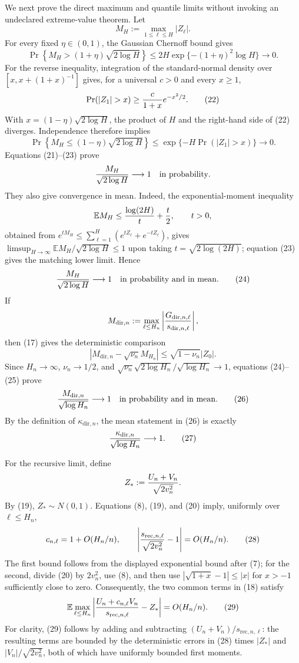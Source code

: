 We next prove the direct maximum and quantile limits without invoking an undeclared extreme-value theorem.  Let
\[
 M_H:=\max_{1\leq\ell\leq H}|Z_\ell|.
\]
For every fixed \(\eta\in(0,1)\), the Gaussian Chernoff bound gives
\[
 \Pr\!\left\{M_H>(1+\eta)\sqrt{2\log H}\right\}
 \leq2H\exp\{- (1+\eta)^2\log H\}\longrightarrow0.
 \tag{21}
\]
For the reverse inequality, integration of the standard-normal density over
\([x,x+(1+x)^{-1}]\) gives, for a universal \(c>0\) and every \(x\geq1\),
\[
 \Pr(|Z_1|>x)\geq {c\over1+x}e^{-x^2/2}.
 \tag{22}
\]
With \(x=(1-\eta)\sqrt{2\log H}\), the product of \(H\) and the right-hand side of (22) diverges.  Independence therefore implies
\[
 \Pr\!\left\{M_H\leq(1-\eta)\sqrt{2\log H}\right\}
 \leq\exp\{-H\Pr(|Z_1|>x)\}\longrightarrow0.
 \tag{23}
\]
Equations (21)--(23) prove
\[
 {M_H\over\sqrt{2\log H}}\longrightarrow1
 \quad\hbox{in probability}.
\]
They also give convergence in mean.  Indeed, the exponential-moment inequality
\[
 \mathbb E M_H\leq {\log(2H)\over t}+{t\over2},
 \qquad t>0,
\]
obtained from \(e^{tM_H}\leq\sum_{\ell=1}^H(e^{tZ_\ell}+e^{-tZ_\ell})\), gives
\(\limsup_{H\to\infty}\mathbb E M_H/\sqrt{2\log H}\leq1\) upon taking \(t=\sqrt{2\log(2H)}\); equation (23) gives the matching lower limit.  Hence
\[
 {M_H\over\sqrt{2\log H}}\longrightarrow1
 \quad\hbox{in probability and in mean}.
 \tag{24}
\]
If
\[
 M_{\mathrm{dir},n}:=\max_{\ell\leq H_n}
 \left|{G_{\mathrm{dir},n,\ell}\over s_{\mathrm{dir},n,\ell}}\right|,
\]
then (17) gives the deterministic comparison
\[
 \left|M_{\mathrm{dir},n}-\sqrt{\nu_n}M_{H_n}\right|
 \leq\sqrt{1-\nu_n}|Z_0|.
 \tag{25}
\]
Since \(H_n\to\infty\), \(\nu_n\to1/2\), and
\(\sqrt{\nu_n}\sqrt{2\log H_n}/\sqrt{\log H_n}\to1\), equations (24)--(25) prove
\[
 {M_{\mathrm{dir},n}\over\sqrt{\log H_n}}\longrightarrow1
 \quad\hbox{in probability and in mean}.
 \tag{26}
\]
By the definition of \(\kappa_{\mathrm{dir},n}\), the mean statement in (26) is exactly
\[
 {\kappa_{\mathrm{dir},n}\over\sqrt{\log H_n}}\longrightarrow1.
 \tag{27}
\]

For the recursive limit, define
\[
 Z_*:={U_n+V_n\over\sqrt{2v_n^2}}.
\]
By (19), \(Z_*\sim N(0,1)\).  Equations (8), (19), and (20) imply, uniformly over \(\ell\leq H_n\),
\[
 c_{n,\ell}=1+O(H_n/n),
 \qquad
 \left|{s_{\mathrm{rec},n,\ell}\over\sqrt{2v_n^2}}-1\right|
 =O(H_n/n).
 \tag{28}
\]
The first bound follows from the displayed exponential bound after (7); for the second, divide (20) by \(2v_n^2\), use (8), and then use
\(|\sqrt{1+x}-1|\leq |x|\) for \(x>-1\) sufficiently close to zero.  Consequently, the two common terms in (18) satisfy
\[
 \mathbb E\max_{\ell\leq H_n}
 \left|{U_n+c_{n,\ell}V_n\over s_{\mathrm{rec},n,\ell}}-Z_*\right|
 =O(H_n/n).
 \tag{29}
\]
For clarity, (29) follows by adding and subtracting \((U_n+V_n)/s_{\mathrm{rec},n,\ell}\): the resulting terms are bounded by the deterministic errors in (28) times \(|Z_*|\) and \(|V_n|/\sqrt{2v_n^2}\), both of which have uniformly bounded first moments.


